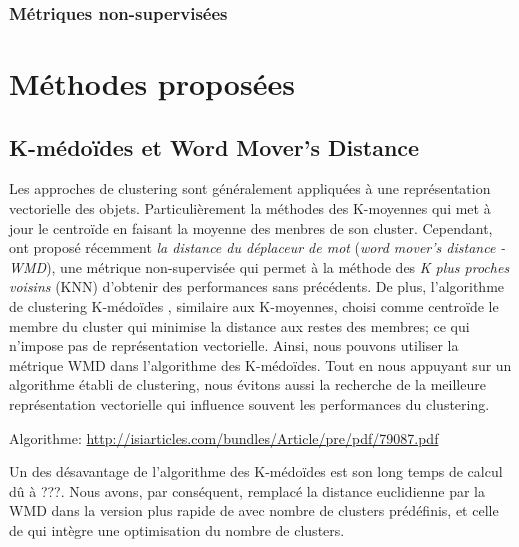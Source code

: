 \subsubsection{Métriques non-supervisées}
\label{sec:similarite:biblio:unsupeval}



\section{Méthodes proposées}

\subsection{K-médoïdes et \og Word Mover's Distance \fg}

Les approches de clustering sont généralement appliquées à une représentation vectorielle des objets. Particulièrement la méthodes des K-moyennes qui met à jour le centroïde en faisant la moyenne des menbres de son cluster. Cependant, \cite{kusner2015wordmoverdist} ont proposé récemment \textit{la distance du déplaceur de mot} (\textit{word mover's distance - WMD}), une métrique non-supervisée qui permet à la méthode des \textit{K plus proches voisins} (KNN) d'obtenir des performances sans précédents. De plus, l'algorithme de clustering K-médoïdes \citep{kaufman1987kmedoids}, similaire aux K-moyennes, choisi comme centroïde le membre du cluster qui minimise la distance aux restes des membres; ce qui n'impose pas de représentation vectorielle. Ainsi, nous pouvons utiliser la métrique WMD dans  l'algorithme des K-médoïdes. Tout en nous appuyant sur un algorithme établi de clustering, nous évitons aussi la recherche de la meilleure représentation vectorielle qui influence souvent les performances du clustering. 

Algorithme: \url{http://isiarticles.com/bundles/Article/pre/pdf/79087.pdf}


Un des désavantage de l'algorithme des K-médoïdes est son long temps de calcul dû à ???. Nous avons, par conséquent, remplacé la distance euclidienne par la WMD dans la version plus rapide de \cite{Park2009fastkmedoids} avec nombre de clusters prédéfinis, et celle de \cite{sabzi2011fuzzykmedoids} qui intègre une optimisation du nombre de clusters.

